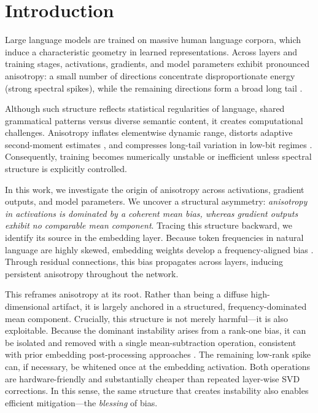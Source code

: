 \section{Introduction}

Large language models are trained on massive human language corpora,
which induce a characteristic geometry in learned representations.
Across layers and training stages, activations, gradients, and model parameters
exhibit pronounced anisotropy:
a small number of directions concentrate disproportionate energy
(strong spectral spikes),
while the remaining directions form a broad long tail
\cite{ethayarajh2019contextual,mu2018all,timkey2021rogue,kovaleva2021bertbusters,machina2024anisotropy}.

Although such structure reflects statistical regularities of language,
shared grammatical patterns versus diverse semantic content, it creates computational challenges.
Anisotropy inflates elementwise dynamic range,
distorts adaptive second-moment estimates \cite{kingma2014adam,loshchilov2017adamw,spectra2026},
and compresses long-tail variation in low-bit regimes
\cite{xiao2023smoothquant,frantar2022gptq,lin2024awq,li2024svdquant,ashkboos2024quarot}.
Consequently, training becomes numerically unstable or inefficient
unless spectral structure is explicitly controlled.

In this work, we investigate the origin of anisotropy across activations, gradient outputs, and model parameters. We uncover a structural asymmetry: \emph{anisotropy in activations is dominated by a coherent mean bias, whereas gradient outputs exhibit no comparable mean component}. Tracing this structure backward, we identify its source in the embedding layer. Because token frequencies in natural language are highly skewed, embedding weights develop a frequency-aligned bias \cite{mikolov2013efficient,mikolov2013distributed,arora2017simple}. Through residual connections, this bias propagates across layers, inducing persistent anisotropy throughout the network.

This reframes anisotropy at its root.
Rather than being a diffuse high-dimensional artifact,
it is largely anchored in a structured, frequency-dominated mean component.
Crucially, this structure is not merely harmful—it is also exploitable.
Because the dominant instability arises from a rank-one bias,
it can be isolated and removed with a single mean-subtraction operation,
consistent with prior embedding post-processing approaches
\cite{arora2017simple,mu2018all,huang2021whiteningbert}.
The remaining low-rank spike can, if necessary,
be whitened once at the embedding activation.
Both operations are hardware-friendly and substantially cheaper
than repeated layer-wise SVD corrections.
In this sense, the same structure that creates instability
also enables efficient mitigation—the \emph{blessing} of bias.

